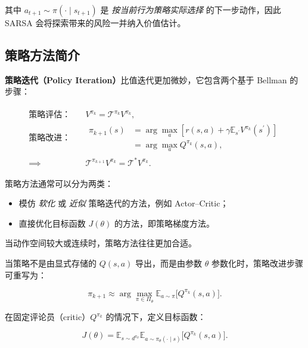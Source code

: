 \documentclass[oneside]{ctexbook}
\begin{document}
其中 $a_{t+1} \sim \pi(\cdot\mid s_{t+1})$ 是 \emph{按当前行为策略实际选择} 的下一步动作，因此 SARSA 会将探索带来的风险一并纳入价值估计。

\subsection{策略方法简介}

\textbf{策略迭代（Policy Iteration）}比值迭代更加微妙，它包含两个基于 Bellman 的步骤：

\begin{gather}
\begin{aligned}
\text{策略评估：}\quad
& V^{\pi_k} = \mathcal T^{\pi_k} V^{\pi_k}, \\
\text{策略改进：}\quad
&
\begin{aligned}
\pi_{k+1}(s)
&=
\arg\max_a
\left[
r(s,a)
+
\gamma
\mathbb E_{s^\prime} V^{\pi_k}(s^\prime)
\right] \\
&=
\arg\max_a Q^{\pi_k}(s,a),
\end{aligned}
\\
\implies\quad
& \mathcal T^{\pi_{k+1}} V^{\pi_k}
=
\mathcal T^{\ast} V^{\pi_k}.
\end{aligned}
\end{gather}

策略方法通常可以分为两类：

\begin{itemize}
\item 模仿 \emph{软化} 或 \emph{近似} 策略迭代的方法，例如 Actor--Critic；
\item 直接优化目标函数 $J(\theta)$ 的方法，即策略梯度方法。
\end{itemize}

当动作空间较大或连续时，策略方法往往更加合适。

当策略不是由显式存储的 $Q(s,a)$ 导出，而是由参数 $\theta$ 参数化时，策略改进步骤可重写为：

\begin{equation}
\pi_{k+1}
\approx
\arg\max_{\pi \in \Pi_\theta}
\mathbb E_{a\sim\pi}
\bigl[
Q^{\pi_k}(s,a)
\bigr].
\end{equation}

在固定评论员（critic）$Q^{\pi_k}$ 的情况下，定义目标函数：

\begin{equation}
J(\theta)
=
\mathbb E_{s\sim d^{\pi_k}}
\mathbb E_{a\sim \pi_\theta(\cdot\mid s)}
\bigl[
Q^{\pi_k}(s,a)
\bigr].
\end{equation}
\end{document}
